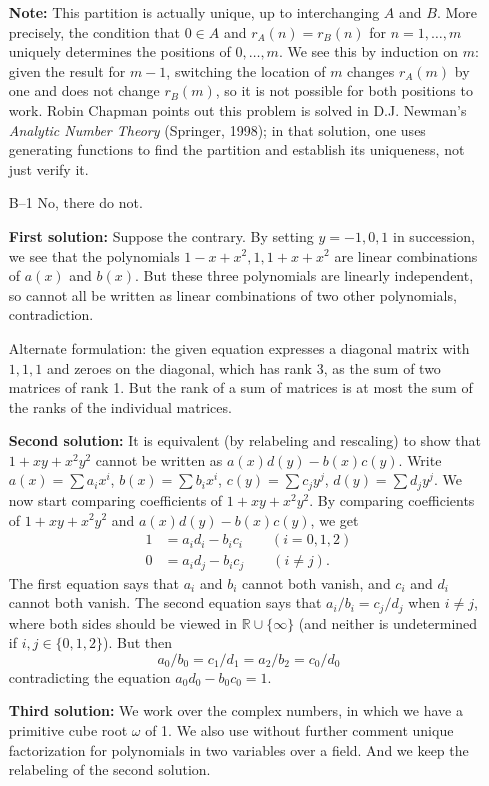 \documentclass[amssymb,twocolumn,pra,10pt,aps]{revtex4-1}
\newcommand{\RR}{\mathbb{R}}
\begin{document}
\begin{itemize}
\textbf{Note:}
This partition is actually unique, up to interchanging $A$ and $B$.
More precisely, the condition that $0 \in A$ and $r_A(n) = r_B(n)$ for
$n=1, \dots, m$ uniquely determines the positions of $0, \dots, m$. We
see this by induction on $m$: given the result for $m-1$, switching the
location of $m$ changes $r_A(m)$ by one and does not change $r_B(m)$, so
it is not possible for both positions to work.  Robin Chapman points out
this problem is solved in D.J. Newman's \textit{Analytic Number Theory}
(Springer, 1998); in that solution, one uses generating functions to find
the partition and establish its uniqueness, not just verify it.

\item[B--1]
No, there do not.

\textbf{First solution:}
Suppose the contrary.  By setting $y=-1,0,1$ in succession, we see that
the polynomials $1-x+x^2, 1, 1+x+x^2$ are linear combinations of $a(x)$
and $b(x)$.  But these three polynomials are linearly independent, so
cannot all be written as linear combinations of two other polynomials,
contradiction.

Alternate formulation: the given equation expresses a diagonal matrix with
$1,1,1$ and zeroes on the diagonal, which has rank 3, as the sum of two
matrices of rank 1. But the rank of a sum of matrices is at most the sum
of the ranks of the individual matrices.

\textbf{Second solution:}
It is equivalent (by relabeling and rescaling)
to show that $1 + xy + x^2y^2$ cannot be written
as $a(x) d(y) - b(x) c(y)$.
Write $a(x) = \sum a_i x^i$,
$b(x) = \sum b_i x^i$, $c(y) = \sum c_j y^j$,
$d(y) = \sum d_j y^j$. We now start comparing coefficients
of $1 + xy + x^2 y^2$. By comparing coefficients of
$1+xy + x^2y^2 $ and $a(x)d(y) - b(x)c(y)$, we get
\begin{align*}
1 &= a_id_i - b_i c_i \qquad (i=0,1,2)\\
0 &= a_id_j - b_i c_j \qquad (i \neq j).
\end{align*}
The first equation says that $a_i$ and $b_i$ cannot both vanish,
and $c_i$ and $d_i$ cannot both vanish. The second equation says that
$a_i/b_i = c_j/d_j$ when $i \neq j$, where both sides should be viewed
in $\RR \cup \{\infty\}$ (and neither is undetermined if
$i,j \in \{0,1,2\}$). But then
\[
a_0/b_0 = c_1/d_1 = a_2/b_2 = c_0/d_0
\]
contradicting the equation $a_0d_0 - b_0c_0 = 1$.

\textbf{Third solution:}
We work over the complex numbers, in which we have a primitive cube root
$\omega$ of 1. We also use without further comment unique factorization
for polynomials in two variables over a field.  And we keep the relabeling
of the second solution.


\end{itemize}
\end{document}
